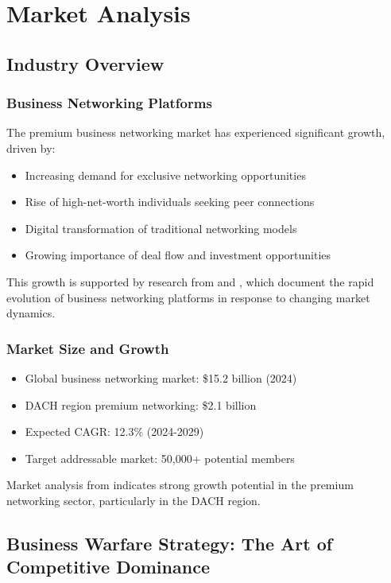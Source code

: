 \chapter{Market Analysis}

\section{Industry Overview}

\subsection{Business Networking Platforms}
The premium business networking market has experienced significant growth, driven by:
\begin{itemize}
    \item Increasing demand for exclusive networking opportunities
    \item Rise of high-net-worth individuals seeking peer connections
    \item Digital transformation of traditional networking models
    \item Growing importance of deal flow and investment opportunities
\end{itemize}

This growth is supported by research from \citep{wang_overview_of_tourism} and \citep{adali_todays_rapidly_evolving}, which document the rapid evolution of business networking platforms in response to changing market dynamics.

\subsection{Market Size and Growth}
\begin{itemize}
    \item Global business networking market: \$15.2 billion (2024)
    \item DACH region premium networking: \$2.1 billion
    \item Expected CAGR: 12.3\% (2024-2029)
    \item Target addressable market: 50,000+ potential members
\end{itemize}

Market analysis from \citep{unknown_building_a_digital} indicates strong growth potential in the premium networking sector, particularly in the DACH region.

\section{Business Warfare Strategy: The Art of Competitive Dominance}


